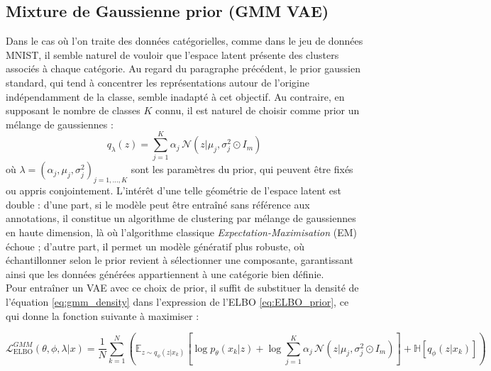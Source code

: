 \documentclass{article}
\begin{document}
        \subsection{Mixture de Gaussienne prior (GMM VAE)}
            Dans le cas où l'on traite des données catégorielles, comme dans le jeu de données MNIST, il semble naturel de vouloir que l'espace latent présente des clusters associés à chaque catégorie. Au regard du paragraphe précédent, le prior gaussien standard, qui tend à concentrer les représentations autour de l'origine indépendamment de la classe, semble inadapté à cet objectif. Au contraire, en supposant le nombre de classes $K$ connu, il est naturel de choisir comme prior un mélange de gaussiennes \cite{dilokthanakulDeepUnsupervisedClustering2017} :
            \begin{equation}
                \label{eq:gmm_density}
                q_\lambda(z) = \sum_{j=1}^K \alpha_j\,\mathcal{N}(z|\mu_j, \sigma_j^2 \odot I_m)
            \end{equation}
            où $\lambda = (\alpha_j, \mu_j, \sigma_j^2)_{j=1,\dots,K}$ sont les paramètres du prior, qui peuvent être fixés ou appris conjointement. L'intérêt d'une telle géométrie de l'espace latent est double : d'une part, si le modèle peut être entraîné sans référence aux annotations, il constitue un algorithme de clustering par mélange de gaussiennes en haute dimension, là où l'algorithme classique \textit{Expectation-Maximisation} (EM) échoue ; d'autre part, il permet un modèle génératif plus robuste, où échantillonner selon le prior revient à sélectionner une composante, garantissant ainsi que les données générées appartiennent à une catégorie bien définie.\\

            Pour entraîner un VAE avec ce choix de prior, il suffit de substituer la densité de l'équation \eqref{eq:gmm_density} dans l'expression de l'ELBO \eqref{eq:ELBO_prior}, ce qui donne la fonction suivante à maximiser :

            \begin{equation}
                \label{eq:ELBO_gmm}
                \mathcal{L}_{\mathrm{ELBO}}^{GMM}(\theta, \phi, \lambda | x) = \frac{1}{N}\sum_{k=1}^N\left( \mathbb{E}_{z \sim q_\phi(z|x_k)}\!\left[\log p_\theta(x_k|z) + \log \sum_{j=1}^K \alpha_j\,\mathcal{N}(z|\mu_j, \sigma_j^2 \odot I_m)\right] + \mathbb{H}\!\left[q_\phi(z|x_k)\right]\right)
            \end{equation}
    
            
\end{document}

